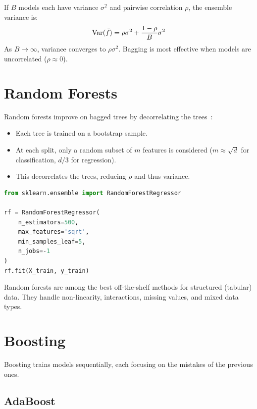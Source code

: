 \begin{theorem}
	If $B$ models each have variance $\sigma^2$ and pairwise correlation $\rho$, the ensemble variance is:
	\[
		\operatorname{Var}(\bar{f}) = \rho \sigma^2 + \frac{1 - \rho}{B} \sigma^2
	\]
	As $B \to \infty$, variance converges to $\rho \sigma^2$. Bagging is most effective when models are uncorrelated ($\rho \approx 0$).
\end{theorem}

\section{Random Forests}

Random forests improve on bagged trees by decorrelating the trees~\cite{breiman2001random}:

\begin{itemize}
	\item Each tree is trained on a bootstrap sample.
	\item At each split, only a random subset of $m$ features is considered ($m \approx \sqrt{d}$ for classification, $d/3$ for regression).
	\item This decorrelates the trees, reducing $\rho$ and thus variance.
\end{itemize}

\begin{lstlisting}[language=Python, caption=Random forest]
from sklearn.ensemble import RandomForestRegressor

rf = RandomForestRegressor(
    n_estimators=500,
    max_features='sqrt',
    min_samples_leaf=5,
    n_jobs=-1
)
rf.fit(X_train, y_train)
\end{lstlisting}

Random forests are among the best off-the-shelf methods for structured (tabular) data. They handle non-linearity, interactions, missing values, and mixed data types.

\section{Boosting}

Boosting trains models sequentially, each focusing on the mistakes of the previous ones.

\subsection{AdaBoost}

